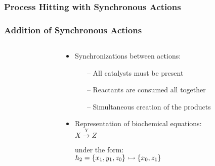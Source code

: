 
\begin{frame}[c]
  \frametitle{Process Hitting with Synchronous Actions}


\end{frame}



\begin{frame}[c]
  \frametitle{Addition of Synchronous Actions}

\begin{columns}
\begin{column}{.4\textwidth}


\end{column}
\begin{column}{.55\textwidth}
\begin{center}

\begin{itemize}
  \item Synchronizations between actions:
  \begin{itemize}
    \item[--] All catalysts must be present
    \item[--] Reactants are consumed all together
    \item[--] Simultaneous creation of the products
  \end{itemize}
  \item Representation of biochemical equations:\\
    \centering $X \xrightarrow{Y} Z$\\
    \raggedright under the form:\\
    \centering $h_2 = \mbox{$\{x_1, y_1, z_0\} \rightarrowtail \{x_0, z_1\}$}$\\
\end{itemize}


\end{center}
\end{column}
\end{columns}
\end{frame}
